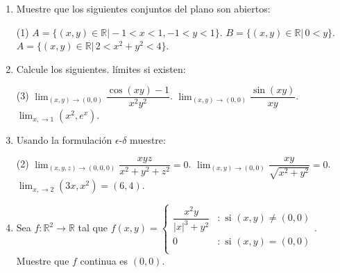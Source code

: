 \documentclass[letterpaper,11pt]{article}
\begin{document}
\begin{enumerate}


\item  Muestre que los siguientes conjuntos del plano son abiertos: 

\begin{tasks}(1)
\task $A = \{ (x,y) \in \mathbb{R} \vert - 1 < x < 1, - 1 < y < 1 \}$.
\task $B = \{ (x,y) \in \mathbb{R} \vert \,  0 < y  \}$.
\task $A = \{ (x,y) \in \mathbb{R} \vert \, 2 < x^2  + y^2 <  4 \}$.
\end{tasks}


\item  Calcule los siguientes. límites si existen: 

\begin{tasks}(3)
\task $\displaystyle\lim_{(x,y) \to (0,0)} \dfrac{\cos(xy) - 1}{x^2y^2}$.
\task $\displaystyle\lim_{(x,y) \to (0,0)} \dfrac{\sin(xy) }{xy}$.
\task $\displaystyle\lim_{x, \to 1} (x^2 , e^x) $.
\end{tasks}

\item  Usando la formulación $\epsilon$-$\delta$ muestre: 

\begin{tasks}(2)
\task $\displaystyle\lim_{(x,y,z) \to (0,0,0)} \dfrac{xyz}{x^2 + y^2 + z^2} = 0$.
\task $\displaystyle\lim_{(x,y) \to (0,0)} \dfrac{xy }{\sqrt{x^2 + y^2}} = 0$.
\task $\displaystyle\lim_{x, \to 2} (3x , x^2) = (6,4) $.
\end{tasks}
\item  Sea $f: \mathbb{R}^2  \longrightarrow \mathbb{R}$ tal que $f(x,y) = \left\{
     \begin{array}{cl}
       \dfrac{x^2y}{\vert x \vert^3 + y^2} & : \text{ si } (x,y) \neq (0,0)\\
       0 & : \text{ si } (x,y) = (0,0)\\
     \end{array}
   \right.$. Muestre que $f$ continua es $(0,0)$.



\end{enumerate}
\end{document}
